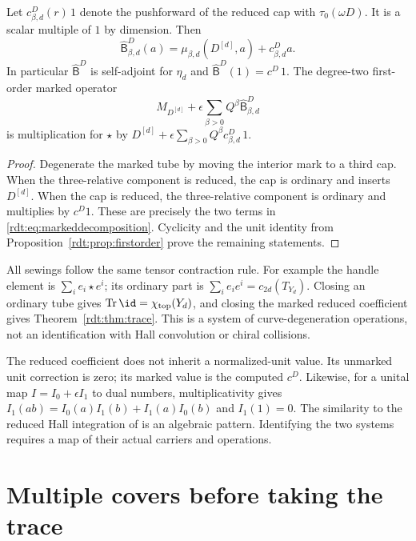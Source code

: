 \begin{proposition}\label{rdt:prop:markedstate}
Let $c^D_{\beta,d}(r)\,1$ denote the pushforward of the reduced cap
with $\tau_0(\omega D)$. It is a scalar multiple of $1$ by dimension.
Then
\begin{equation}\label{rdt:eq:markeddecomposition}
 \widehat{\mathsf B}^D_{\beta,d}(a)
   =\mu_{\beta,d}(D^{[d]},a)+c^D_{\beta,d}a.
\end{equation}
In particular $\widehat{\mathsf B}^D$ is self-adjoint for $\eta_d$ and
$\widehat{\mathsf B}^D(1)=c^D\,1$. The degree-two first-order marked operator
\[
 M_{D^{[d]}}+\epsilon\sum_{\beta>0}Q^\beta\widehat{\mathsf B}^D_{\beta,d}
\]
is multiplication for $\star$ by
$D^{[d]}+\epsilon\sum_{\beta>0}Q^\beta c^D_{\beta,d}\,1$.
\end{proposition}
\begin{proof}
Degenerate the marked tube by moving the interior mark to a third cap.
When the three-relative component is reduced, the cap is ordinary and
inserts $D^{[d]}$. When the cap is reduced, the three-relative
component is ordinary and multiplies by $c^D1$. These are precisely
the two terms in \eqref{rdt:eq:markeddecomposition}. Cyclicity and the
unit identity from Proposition~\ref{rdt:prop:firstorder} prove the
remaining statements.
\end{proof}

All sewings follow the same tensor contraction rule. For example the
handle element is $\sum_i e_i\star e^i$; its ordinary part is
$\sum_i e_i e^i=c_{2d}(T_{Y_d})$. Closing an ordinary tube gives
$\operatorname{Tr}\id=\chi_{\mathrm{top}}(Y_d)$, and closing the marked reduced
coefficient gives Theorem~\ref{rdt:thm:trace}. This is a system of
curve-degeneration operations, not an identification with Hall
convolution or chiral collisions.

The reduced coefficient does not inherit a normalized-unit value.
Its unmarked unit correction is zero; its marked value is the computed
$c^D$. Likewise, for a unital map $I=I_0+\epsilon I_1$ to dual
numbers, multiplicativity gives
$I_1(ab)=I_0(a)I_1(b)+I_1(a)I_0(b)$ and $I_1(1)=0$.
The similarity to the reduced Hall integration of
\cite{OberdieckShenReduced} is an algebraic pattern. Identifying the two
systems requires a map of their actual carriers and operations.

\section{Multiple covers before taking the trace}
\label{rdt:sec:covers}

